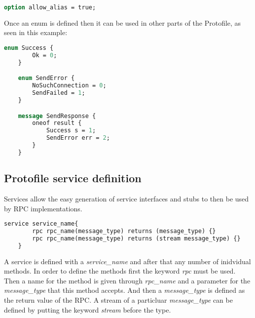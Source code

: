 \begin{minipage}{\textwidth}
\begin{lstlisting}[language=ProtoBuf]
    option allow_alias = true;
\end{lstlisting}
\end{minipage}

Once an enum is defined then it can be used in other parts of the Protofile, as seen in this example:

\begin{minipage}{\textwidth}
\begin{lstlisting}[language=ProtoBuf, caption=Excerpt taken from the ProtoBuf files of this project]
    enum Success {
        Ok = 0;
    }

    enum SendError {
        NoSuchConnection = 0;
        SendFailed = 1;
    }

    message SendResponse {
        oneof result {
            Success s = 1;
            SendError err = 2;
        }
    }
\end{lstlisting}
\end{minipage}

\subsection{Protofile service definition}

Services allow the easy generation of service interfaces and stubs to then be used by RPC implementations.

\begin{minipage}{\textwidth}
\begin{lstlisting}[language=ProtoBuf, caption=Example of service definition in Protofiles]
    service service_name{
        rpc rpc_name(message_type) returns (message_type) {}
        rpc rpc_name(message_type) returns (stream message_type) {}
    }
\end{lstlisting}
\end{minipage}

A service is defined with a \textit{service\_name} and after that any number of inidvidual methods. In order to define the methods first the keyword \textit{rpc} must be used.
Then a name for the method is given through \textit{rpc\_name} and a parameter for the \textit{message\_type} that this method accepts. And then a \textit{message\_type}
is defined as the return value of the RPC. A stream of a particluar \textit{message\_type} can be defined by putting the keyword \textit{stream} before the type.

